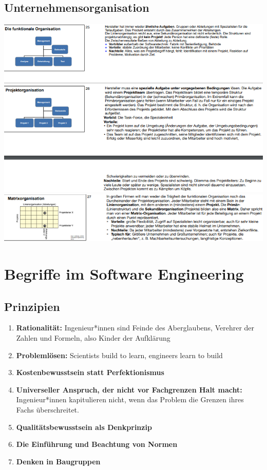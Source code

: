 \documentclass{article}
\begin{document}
  \subsection*{Unternehmensorganisation}
	\includegraphics[scale=1.3]{media/Organisationsformen4.png}\\
	\includegraphics[scale=1.3]{media/Organisationsformen5.png}\\

	
	


\section*{Begriffe im Software Engineering}
\subsection*{Prinzipien}
\begin{enumerate}[label=\alph*)]
\item \textbf{Rationalität: }Ingenieur*innen sind Feinde des Aberglaubens, Verehrer der Zahlen und Formeln, also Kinder der Aufklärung
\item \textbf{Problemlösen: }Scientists build to learn, engineers learn to build
\item \textbf{Kostenbewusstsein statt Perfektionismus }
\item \textbf{Universeller Anspruch, der nicht vor Fachgrenzen Halt macht: }Ingenieur*innen kapitulieren nicht, wenn das Problem die Grenzen ihres Fachs überschreitet.
\item \textbf{Qualitätsbewusstsein als Denkprinzip }
\item \textbf{Die Einführung und Beachtung von Normen }
\item \textbf{Denken in Baugruppen }
\end{enumerate}
\end{document}
